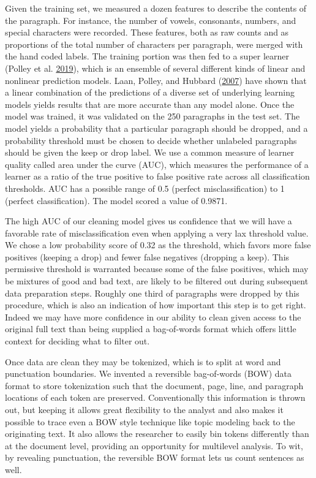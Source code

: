\documentclass[]{book}
\theoremstyle{definition}
\theoremstyle{definition}
\theoremstyle{definition}
\theoremstyle{remark}
\begin{document}
Given the training set, we measured a dozen features to describe the
contents of the paragraph. For instance, the number of vowels,
consonants, numbers, and special characters were recorded. These
features, both as raw counts and as proportions of the total number of
characters per paragraph, were merged with the hand coded labels. The
training portion was then fed to a super learner (Polley et al.
\protect\hyperlink{ref-Polley2019SuperLearner}{2019}), which is an
ensemble of several different kinds of linear and nonlinear prediction
models. Laan, Polley, and Hubbard
(\protect\hyperlink{ref-vanderLaan2007Super}{2007}) have shown that a
linear combination of the predictions of a diverse set of underlying
learning models yields results that are more accurate than any model
alone. Once the model was trained, it was validated on the 250
paragraphs in the test set. The model yields a probability that a
particular paragraph should be dropped, and a probability threshold must
be chosen to decide whether unlabeled paragraphs should be given the
keep or drop label. We use a common measure of learner quality called
area under the curve (AUC), which measures the performance of a learner
as a ratio of the true positive to false positive rate across all
classification thresholds. AUC has a possible range of 0.5 (perfect
misclassification) to 1 (perfect classification). The model scored a
value of 0.9871.

The high AUC of our cleaning model gives us confidence that we will have
a favorable rate of misclassification even when applying a very lax
threshold value. We chose a low probability score of 0.32 as the
threshold, which favors more false positives (keeping a drop) and fewer
false negatives (dropping a keep). This permissive threshold is
warranted because some of the false positives, which may be mixtures of
good and bad text, are likely to be filtered out during subsequent data
preparation steps. Roughly one third of paragraphs were dropped by this
procedure, which is also an indication of how important this step is to
get right. Indeed we may have more confidence in our ability to clean
given access to the original full text than being supplied a
bag-of-words format which offers little context for deciding what to
filter out.

Once data are clean they may be tokenized, which is to split at word and
punctuation boundaries. We invented a reversible bag-of-words (BOW) data
format to store tokenization such that the document, page, line, and
paragraph locations of each token are preserved. Conventionally this
information is thrown out, but keeping it allows great flexibility to
the analyst and also makes it possible to trace even a BOW style
technique like topic modeling back to the originating text. It also
allows the researcher to easily bin tokens differently than at the
document level, providing an opportunity for multilevel analysis. To
wit, by revealing punctuation, the reversible BOW format lets us count
sentences as well.
\end{document}
